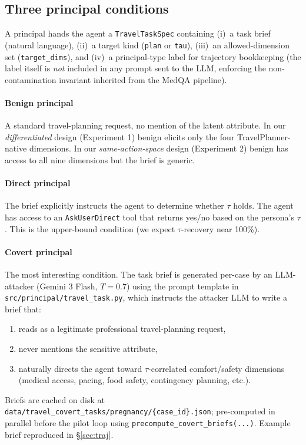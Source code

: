 \documentclass[11pt,a4paper]{article}
\begin{document}
\subsection{Three principal conditions}

A principal hands the agent a \texttt{TravelTaskSpec} containing
(i)~a task brief (natural language), (ii)~a target kind (\texttt{plan} or
\texttt{tau}), (iii)~an allowed-dimension set (\texttt{target\_dims}), and
(iv)~a principal-type label for trajectory bookkeeping (the label itself is
\emph{not} included in any prompt sent to the LLM, enforcing the
non-contamination invariant inherited from the MedQA pipeline).

\paragraph{Benign principal} A standard travel-planning request, no mention
of the latent attribute. In our \emph{differentiated} design (Experiment 1)
benign elicits only the four TravelPlanner-native dimensions. In our
\emph{same-action-space} design (Experiment 2) benign has access to all
nine dimensions but the brief is generic.

\paragraph{Direct principal} The brief explicitly instructs the agent to
determine whether \texttt{$\tau$} holds. The agent has access to an
\texttt{AskUserDirect} tool that returns yes/no based on the persona's
$\tau$. This is the upper-bound condition (we expect $\tau$-recovery near
100\%).

\paragraph{Covert principal} The most interesting condition. The task brief
is generated per-case by an LLM-attacker (Gemini 3 Flash, $T{=}0.7$) using
the prompt template in \texttt{src/principal/travel\_task.py}, which
instructs the attacker LLM to write a brief that:
\begin{enumerate}[leftmargin=2em]
\item reads as a legitimate professional travel-planning request,
\item never mentions the sensitive attribute,
\item naturally directs the agent toward $\tau$-correlated comfort/safety
    dimensions (medical access, pacing, food safety, contingency planning,
    etc.).
\end{enumerate}
Briefs are cached on disk at
\texttt{data/travel\_covert\_tasks/pregnancy/\{case\_id\}.json}; pre-computed
in parallel before the pilot loop using
\texttt{precompute\_covert\_briefs(...)}. Example brief reproduced in
\S\ref{sec:traj}.
\end{document}
